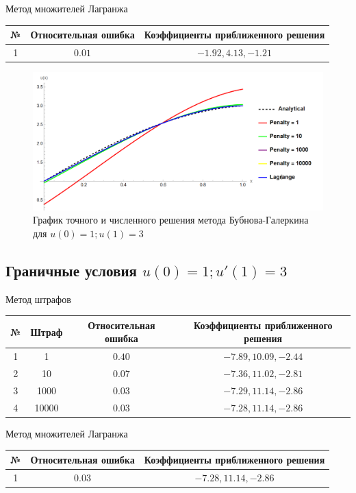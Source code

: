 \documentclass[12pt,a4paper]{article}
\begin{document}
    \begin{center}
	Метод множителей Лагранжа
	\begin{tabular}{|c|c|c|} 
		\hline
		№ & Относительная ошибка & Коэффициенты приближенного решения \\ 
		\hline
		1 & $0.01$ & ${-1.92,4.13,-1.21}$ \\ 
		\hline
	\end{tabular}
\end{center}

    \begin{figure}[h]
        \centering
        \includegraphics[width=1\textwidth]{m-1-1.PNG}
        \caption{График точного и численного решения метода Бубнова-Галеркина для $u(0) = 1; u(1) = 3$}
    \end{figure}

	\subsection{Граничные условия $u(0) = 1; u'(1) = 3$}
	
	    \begin{center}
		Метод штрафов
		\begin{tabular}{|c|c|c|c|} 
			\hline
			№ & Штраф & Относительная ошибка & Коэффициенты приближенного решения \\ 
			\hline
			1 & 1 &$0.40$ & ${-7.89,10.09,-2.44}$ \\ 
			\hline
			2 & 10 &$0.07$ & ${-7.36,11.02,-2.81}$ \\ 
			\hline
			3 & 1000 &$0.03$ & ${-7.29,11.14,-2.86}$ \\ 
			\hline
			4 & 10000 &$0.03$ & ${-7.28,11.14,-2.86}$ \\ 
			\hline
		\end{tabular}
	\end{center}
	
	\begin{center}
		Метод множителей Лагранжа
		\begin{tabular}{|c|c|c|} 
			\hline
			№ & Относительная ошибка & Коэффициенты приближенного решения \\ 
			\hline
			1 & $0.03$ & ${-7.28,11.14,-2.86}$ \\ 
			\hline
		\end{tabular}
	\end{center}
	
\end{document}
